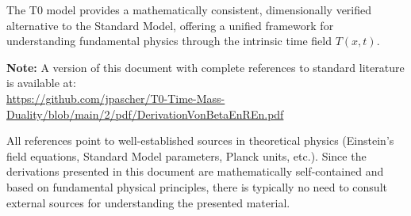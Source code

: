 \documentclass[12pt,a4paper]{article}
\begin{document}
	The T0 model provides a mathematically consistent, dimensionally verified alternative to the Standard Model, offering a unified framework for understanding fundamental physics through the intrinsic time field $T(x,t)$.
	
	
	\begin{thebibliography}{9}
\textbf{Note:} A version of this document with complete references to standard literature is available at: \\
\url{https://github.com/jpascher/T0-Time-Mass-Duality/blob/main/2/pdf/DerivationVonBetaEnREn.pdf}

All references point to well-established sources in theoretical physics (Einstein's field equations, Standard Model parameters, Planck units, etc.). Since the derivations presented in this document are mathematically self-contained and based on fundamental physical principles, there is typically no need to consult external sources for understanding the presented material.
	

	\end{thebibliography}
	
\end{document}
